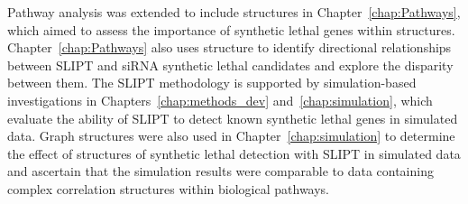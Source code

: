 Pathway analysis was extended to include  structures in Chapter~\ref{chap:Pathways}, which aimed to assess the importance of \gls{synthetic lethal} genes within  structures. Chapter~\ref{chap:Pathways} also uses  structure to identify directional relationships between \gls{SLIPT} and \gls{siRNA} \gls{synthetic lethal} candidates and explore the disparity between them. The \gls{SLIPT} methodology is supported by simulation-based investigations in Chapters~\ref{chap:methods_dev} and~\ref{chap:simulation}, which evaluate the ability of \gls{SLIPT} to detect known \gls{synthetic lethal} genes in simulated data. Graph structures were also used in Chapter~\ref{chap:simulation} to determine the effect of  structures of \gls{synthetic lethal} detection with \gls{SLIPT} in simulated data and ascertain that the simulation results were comparable to  data containing complex correlation structures within biological pathways.


